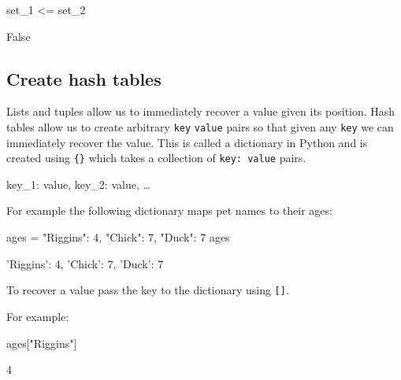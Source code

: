 \begin{pyin}
set_1 <= set_2
\end{pyin}





\begin{raw}
False
\end{raw}





\subsection{Create hash tables}
\label{sec:create_hash_tables}

Lists and tuples allow us to immediately recover a value given its position.
Hash tables allow us to create arbitrary \texttt{key} \texttt{value} pairs so that given any
\texttt{key} we can immediately recover the value. This is called a dictionary in
Python and is created using \texttt{\{\}} which takes a collection of \texttt{key: value}
pairs.


\begin{api}
{key_1: value, key_2: value, …}
\end{api}



For example the following dictionary maps pet names to their ages:




\begin{pyin}
ages = {"Riggins": 4, "Chick": 7, "Duck": 7}
ages
\end{pyin}





\begin{raw}
{'Riggins': 4, 'Chick': 7, 'Duck': 7}
\end{raw}





To recover a value pass the key to the dictionary using \texttt{{[}{]}}.


For example:




\begin{pyin}
ages["Riggins"]
\end{pyin}





\begin{raw}
4
\end{raw}





